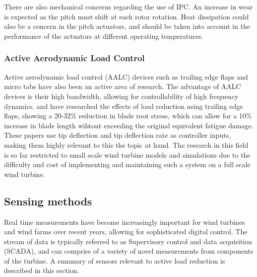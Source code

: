 \\~\\
There are also mechanical concerns regarding the use of IPC. An increase in wear is expected as the pitch must shift at each rotor rotation. Heat dissipation could also be a concern in the pitch actuators, and should be taken into account in the performance of the actuators at different operating temperatures.


\subsubsection{Active Aerodynamic Load Control}
Active aerodynamic load control (AALC) devices such as trailing edge flaps and micro tabs have also been an active area of research. The advantage of AALC devices is their high bandwidth, allowing for controllability of high frequency dynamics. \citet{7_Berg} and \citet{10_Wilson} have researched the effects of load reduction using trailing edge flaps, showing a 20-32\% reduction in blade root stress, which can allow for a 10\% increase in blade length wihtout exceeding the original equivalent fatigue damage. These papers use tip deflection and tip deflection rate  as controller inputs, making them highly relevant to this the topic at hand. The research in this field is so far restricted to small scale wind turbine models and simulations due to the difficulty and cost of implementing and maintaining such a system on a full scale wind turbine. 
\subsection{Sensing methods}
Real time measurements have become increasingly important for wind turbines and wind farms over recent years, allowing for sophisticated digital control. The stream of data is typically referred to as Supervisory control and data acquisition (SCADA), and can comprise of a variety of novel measurements from components of the turbine. A summary of sensors relevant to active load reduction is described in this section.
